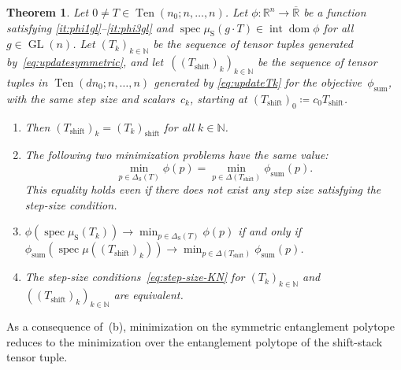 \documentclass[11pt,letterpaper]{article}
\newtheorem{theorem}{Theorem}[section]
\numberwithin{equation}{section}
\newcommand{\RR}{\mathbb{R}}
\newcommand{\NN}{\mathbb{N}}
\DeclareMathOperator{\intr}{int}
\DeclareMathOperator{\dom}{dom}
\DeclareMathOperator{\spec}{spec}
\DeclareMathOperator{\GL}{GL}
\DeclareMathOperator{\Sym}{S}
\DeclareMathOperator{\Ten}{Ten}
\DeclareMathOperator{\Shf}{shift}
\DeclareMathOperator{\Sum}{sum}
\begin{document}
\begin{theorem}\label{thm:tensor power reduction}
    Let $0 \neq T \in \Ten(n_0; n, \ldots, n)$.
    Let $\phi \colon \RR^n \to \overline{\RR}$ be a function satisfying \ref{it:phi1gl}--\ref{it:phi3gl} and $\spec\mu_{\Sym}(g\cdot T) \in \intr\dom\phi$ for all $g \in \GL(n)$.
    Let $(T_k)_{k \in \NN}$ be the sequence of tensor tuples generated by~\eqref{eq:updatesymmetric}, and let~$((T_{\Shf})_k)_{k \in \NN}$ be the sequence of tensor tuples in $\Ten(d n_0; n, \ldots, n)$ generated by \eqref{eq:updateTk} for the objective~$\phi_{\Sum}$, with the same step size and scalars~$c_k$, starting at $(T_{\Shf})_0 \coloneqq c_0 T_{\Shf}$.
    \begin{enumerate}
    \item[(a)] Then $(T_{\Shf})_k = (T_k)_{\Shf}$ for all $k\in\NN$.
    \item[(b)] The following two minimization problems have the same value:
    \[
        \min_{p \in \Delta_{\Sym}(T)}\phi(p) = \min_{p \in \Delta(T_{\Shf})}\phi_{\Sum}(p).
    \]
    This equality holds even if there does not exist any step size satisfying the step-size condition.
    \item[(c)]
    $\phi(\spec \mu_{\Sym}(T_k)) \to \displaystyle\min_{p \in \Delta_{\Sym}(T)}\phi(p)$ if and only if
    $\phi_{\Sum}(\spec \mu((T_{\Shf})_k)) \to \displaystyle\min_{p \in \Delta(T_{\Shf})}\phi_{\Sum}(p)$.
    \item[(d)] The step-size conditions~\eqref{eq:step-size-KN} for $(T_k)_{k \in \NN}$ and $((T_{\Shf})_k)_{k \in \NN}$ are equivalent.
    \end{enumerate}
\end{theorem}
\noindent
As a consequence of~(b), minimization on the symmetric entanglement polytope reduces to the minimization over the entanglement polytope of the shift-stack tensor tuple.
\end{document}
